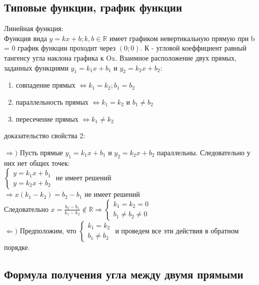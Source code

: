 \documentclass[oneside]{book}
\begin{document}
\begin{enumerate}
\section[Графики]{Типовые функции, график функции}
Линейная функция:\\
Функция вида $y = kx + b; k, b \in \mathbb{R}$ имеет графиком невертикальную прямую при b = 0 график функции проходит через $(0; 0)$.
К - угловой коеффициент равный тангенсу угла наклона графика к Ox. Взаимное расположение двух прямых, заданных функциями
$y_1 = k_1x + b_1$ и $y_2 = k_2x + b_2$:
\begin{enumerate}
    \item совпадение прямых $\Leftrightarrow k_1 = k_2; b_1 = b_2$
    \item параллельность прямых $\Leftrightarrow k_1 = k_2 \textbf{ и } b_1 \neq b_2$
    \item пересечение прямых $\Leftrightarrow k_1 \neq k_2$
\end{enumerate}

доказательство свойства 2:
\begin{center}
    $\Rightarrow )$ Пусть прямые $y_1 = k_1x + b_1$ и $y_2 = k_2x + b_2$ параллельны. Следовательно у них нет общих точек:\\
    $\begin{cases}
        y = k_1x + b_1 \\
        y = k_2x + b_2
    \end{cases}$ не имеет решений \\ $\Rightarrow x(k_1 - k_2) = b_2 - b_1$ не имеет решений\\
    Следовательно $x = \frac{b_2-b_1}{k_1-k_2} \notin \mathbb{R} \Rightarrow \begin{cases}
        k_1 = k_2=0 \\ b_1 \neq b_2 \neq 0
    \end{cases}$\\
    $\Leftarrow)$ Предположим, что $\begin{cases} k_1 = k_2 \\ b_1 \neq b_2 \end{cases}$ и проведем все эти действия в обратном порядке.
\end{center}

\subsection[угол между прямыми]{Формула получения угла между двумя прямыми}


\end{enumerate}
\end{document}

